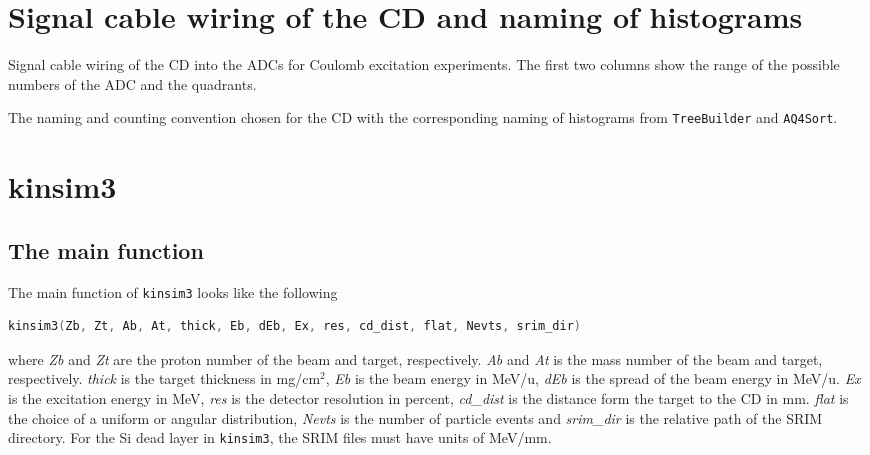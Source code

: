 \documentclass[twoside,english]{uiofysmaster/uiofysmaster}
\begin{document}
\begin{appendices}



\chapter{Signal cable wiring of the CD and naming of histograms}\label{a:signal}

\begin{table}[ht] 
	\centering 
	\caption{Signal cable wiring of the CD into the ADCs for Coulomb excitation experiments.
	The first two columns show the range of the possible numbers of the ADC and the quadrants.}
	
	\label{tab:ADC}
\end{table}


\begin{table}[ht] 
	\centering 
	\caption{The naming and counting convention chosen for the CD with the corresponding naming of histograms from \texttt{TreeBuilder} and \texttt{AQ4Sort}.}
	
	\label{tab:TBvsAQ4}
\end{table}




\chapter{kinsim3}\label{ch:cd_sim}

\section{The main function}
The main function of \texttt{kinsim3} looks like the following
\begin{lstlisting}[language=c++]
kinsim3(Zb, Zt, Ab, At, thick, Eb, dEb, Ex, res, cd_dist, flat, Nevts, srim_dir)
\end{lstlisting}
where \textit{Zb} and \textit{Zt} are the proton number of the beam and target, respectively. 
\textit{Ab} and \textit{At} is the mass number of the beam and target, respectively. 
\textit{thick} is the target thickness in mg/cm$^2$, \textit{Eb} is the beam energy in MeV/u, \textit{dEb} is the spread of the beam energy in MeV/u. 
\textit{Ex} is the excitation energy in MeV, \textit{res} is the detector resolution in percent, \textit{cd\_dist} is the distance form the target to the CD in mm. 
\textit{flat} is the choice of a uniform or angular distribution, \textit{Nevts} is the number of particle events and \textit{srim\_dir} is the relative path of the SRIM directory.
For the Si dead layer in \texttt{kinsim3}, the SRIM files must have units of MeV/mm. 


\end{appendices}
\end{document}
